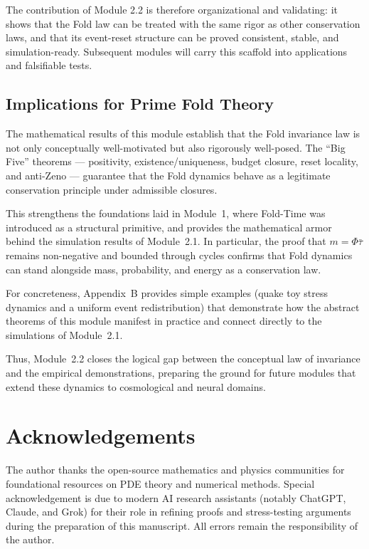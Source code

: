 \documentclass[11pt]{article}
\begin{document}
The contribution of Module 2.2 is therefore organizational and validating: 
it shows that the Fold law can be treated with the same rigor as other 
conservation laws, and that its event-reset structure can be proved consistent, 
stable, and simulation-ready. Subsequent modules will carry this scaffold 
into applications and falsifiable tests.

\subsection*{Implications for Prime Fold Theory}

The mathematical results of this module establish that the Fold invariance law is not only conceptually well-motivated but also rigorously well-posed. 
The ``Big Five'' theorems --- positivity, existence/uniqueness, budget closure, reset locality, and anti-Zeno --- guarantee that the Fold dynamics behave as a legitimate conservation principle under admissible closures. 

This strengthens the foundations laid in Module~1, where Fold-Time was introduced as a structural primitive, and provides the mathematical armor behind the simulation results of Module~2.1. 
In particular, the proof that $m = \Phi \bar{\tau}$ remains non-negative and bounded through cycles confirms that Fold dynamics can stand alongside mass, probability, and energy as a conservation law. 

For concreteness, Appendix~B provides simple examples (quake toy stress dynamics and a uniform event redistribution) that demonstrate how the abstract theorems of this module manifest in practice and connect directly to the simulations of Module~2.1.

Thus, Module~2.2 closes the logical gap between the conceptual law of invariance and the empirical demonstrations, preparing the ground for future modules that extend these dynamics to cosmological and neural domains.

\section*{Acknowledgements}

The author thanks the open-source mathematics and physics communities for foundational resources on PDE theory and numerical methods.  
Special acknowledgement is due to modern AI research assistants (notably ChatGPT, Claude, and Grok) for their role in refining proofs and stress-testing arguments during the preparation of this manuscript.  
All errors remain the responsibility of the author.
\end{document}
